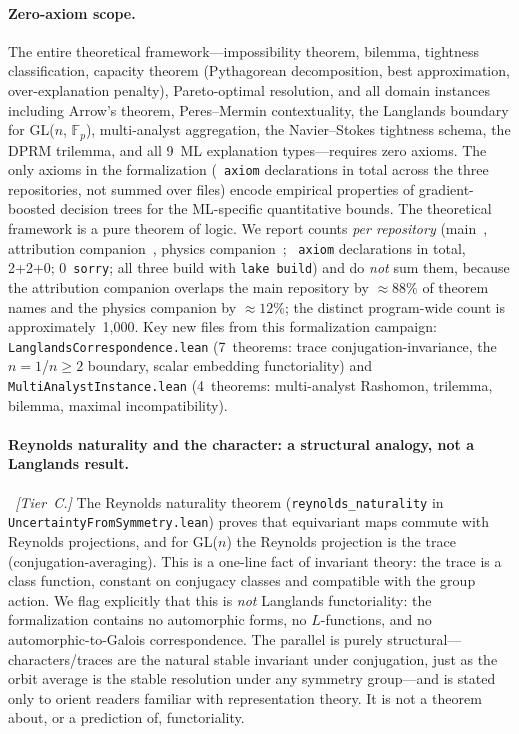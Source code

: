 \documentclass[11pt,a4paper]{article}
\begin{document}
\paragraph{Zero-axiom scope.}
The entire theoretical framework---impossibility theorem, bilemma, tightness classification, capacity theorem (Pythagorean decomposition, best approximation, over-explanation penalty), Pareto-optimal resolution, and all domain instances including Arrow's theorem, Peres--Mermin contextuality, the Langlands boundary for GL($n$, $\mathbb{F}_p$), multi-analyst aggregation, the Navier--Stokes tightness schema, the DPRM trilemma, and all 9~ML explanation types---requires zero axioms.  The only axioms in the formalization (\ClaimTotalAxioms~\texttt{axiom} declarations in total across the three repositories, not summed over files) encode empirical properties of gradient-boosted decision trees for the ML-specific quantitative bounds.  The theoretical framework is a pure theorem of logic.  We report counts \emph{per repository}
(main~\ClaimMainTheorems, attribution companion~\ClaimDashTheorems, physics companion~\ClaimOstrowskiTheorems; \ClaimTotalAxioms~\texttt{axiom} declarations in
total, 2+2+0; 0~\texttt{sorry}; all three build with \texttt{lake build}) and do \emph{not} sum
them, because the attribution companion overlaps the main repository by ${\approx}88\%$ of theorem
names and the physics companion by ${\approx}12\%$; the distinct program-wide count is
approximately~1{,}000.  Key new files from this formalization campaign: \texttt{LanglandsCorrespondence.lean} (7~theorems: trace conjugation-invariance, the $n{=}1$/$n{\geq}2$ boundary, scalar embedding functoriality) and \texttt{MultiAnalystInstance.lean} (4~theorems: multi-analyst Rashomon, trilemma, bilemma, maximal incompatibility).

\paragraph{Reynolds naturality and the character: a structural analogy, not a Langlands result.}\emph{~[Tier~C.]}
The Reynolds naturality theorem (\texttt{reynolds\_naturality} in \texttt{UncertaintyFromSymmetry.lean}) proves that equivariant maps commute with Reynolds projections, and for GL($n$) the Reynolds projection is the trace (conjugation-averaging).  This is a one-line fact of invariant theory: the trace is a class function, constant on conjugacy classes and compatible with the group action.  We flag explicitly that this is \emph{not} Langlands functoriality: the formalization contains no automorphic forms, no $L$-functions, and no automorphic-to-Galois correspondence.  The parallel is purely structural---characters/traces are the natural stable invariant under conjugation, just as the orbit average is the stable resolution under any symmetry group---and is stated only to orient readers familiar with representation theory. It is not a theorem about, or a prediction of, functoriality.
\end{document}
